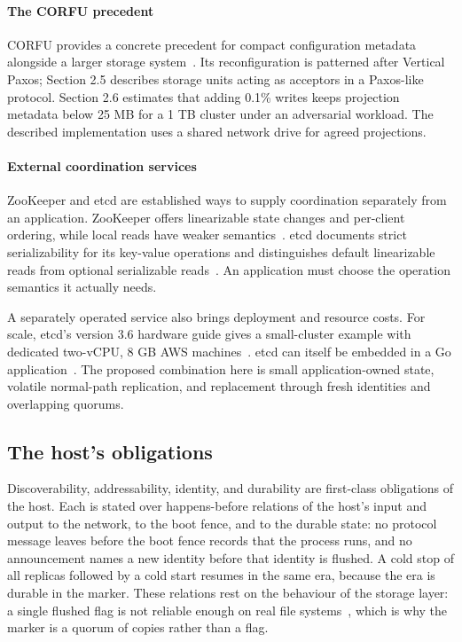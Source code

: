 \documentclass[10pt,journal,letterpaper]{IEEEtran}
\begin{document}
\paragraph{The CORFU precedent}
CORFU provides a concrete precedent for compact configuration metadata alongside a larger storage system~\cite{corfu}. Its reconfiguration is patterned after Vertical Paxos; Section 2.5 describes storage units acting as acceptors in a Paxos-like protocol. Section 2.6 estimates that adding 0.1\% writes keeps projection metadata below 25 MB for a 1 TB cluster under an adversarial workload. The described implementation uses a shared network drive for agreed projections.

\paragraph{External coordination services}
ZooKeeper and etcd are established ways to supply coordination separately from an application. ZooKeeper offers linearizable state changes and per-client ordering, while local reads have weaker semantics~\cite{zookeeper}. etcd documents strict serializability for its key-value operations and distinguishes default linearizable reads from optional serializable reads~\cite{etcd-guarantees}. An application must choose the operation semantics it actually needs.

A separately operated service also brings deployment and resource costs. For scale, etcd's version 3.6 hardware guide gives a small-cluster example with dedicated two-vCPU, 8 GB AWS machines~\cite{etcd-hardware}. etcd can itself be embedded in a Go application~\cite{etcd-embed}. The proposed combination here is small application-owned state, volatile normal-path replication, and replacement through fresh identities and overlapping quorums.

\subsection{The host's obligations}
Discoverability, addressability, identity, and durability are first-class
obligations of the host. Each is stated over happens-before relations of the
host's input and output to the network, to the boot fence, and to the durable
state: no protocol message leaves before the boot fence records that the
process runs, and no announcement names a new identity before that identity is
flushed. A cold stop of all replicas followed by a cold start resumes in the
same era, because the era is durable in the marker. These relations rest on the
behaviour of the storage layer: a single flushed flag is not reliable enough on
real file systems~\cite{allfs,optimistic-crash}, which is why the marker is a
quorum of copies rather than a flag.
\end{document}
